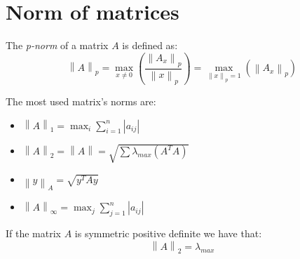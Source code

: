 \documentclass[12pt, a4paper]{report}
\begin{document}
    \section{Norm of matrices}
    \begin{definition}
        The \emph{p-norm} of a matrix $A$ is defined as: 
        \[\left\lVert A \right\rVert_p=\max_{x \neq 0}{\left( \dfrac{\left\lVert A_x \right\rVert_p}{\left\lVert x \right\rVert_p} \right)}=
        \max_{\left\lVert x \right\rVert_p=1}{\left( \left\lVert A_x \right\rVert_p \right)}\]
    \end{definition}
    The most used matrix's norms are: 
    \begin{itemize}
        \item $\left\lVert A \right\rVert_1=\max_{i}{\sum_{i=1}^{n}{\left\lvert a_{ij} \right\rvert}}$
        \item $\left\lVert A \right\rVert_2=\left\lVert A \right\rVert=\sqrt{\sum{\lambda_{max}{\left( A^TA \right)}}}$
        \item $\left\lVert y \right\rVert_A=\sqrt{y^TAy}$
        \item $\left\lVert A \right\rVert_{\infty}=\max_{j}{\sum_{j=1}^{n}{\left\lvert a_{ij} \right\rvert}}$
    \end{itemize}
    \begin{proposition}
        If the matrix $A$ is symmetric positive definite we have that: 
        \[\left\lVert A \right\rVert_2=\lambda_{max}\]
    \end{proposition}

    
\end{document}
